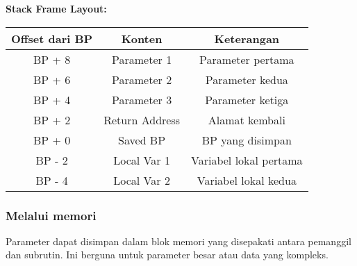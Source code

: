 \documentclass[../main.tex]{subfiles}
\begin{document}
                \textbf{Stack Frame Layout:}
                \begin{center}
                    \begin{tabular}{|c|c|c|}
                        \hline
                        \textbf{Offset dari BP} & \textbf{Konten} & \textbf{Keterangan} \\
                        \hline
                        BP + 8 & Parameter 1 & Parameter pertama \\
                        \hline
                        BP + 6 & Parameter 2 & Parameter kedua \\
                        \hline
                        BP + 4 & Parameter 3 & Parameter ketiga \\
                        \hline
                        BP + 2 & Return Address & Alamat kembali \\
                        \hline
                        BP + 0 & Saved BP & BP yang disimpan \\
                        \hline
                        BP - 2 & Local Var 1 & Variabel lokal pertama \\
                        \hline
                        BP - 4 & Local Var 2 & Variabel lokal kedua \\
                        \hline
                    \end{tabular}
                \end{center}

            \subsubsection{Melalui memori}
                Parameter dapat disimpan dalam blok memori yang disepakati antara pemanggil dan subrutin. Ini berguna untuk parameter besar atau data yang kompleks.
\end{document}
